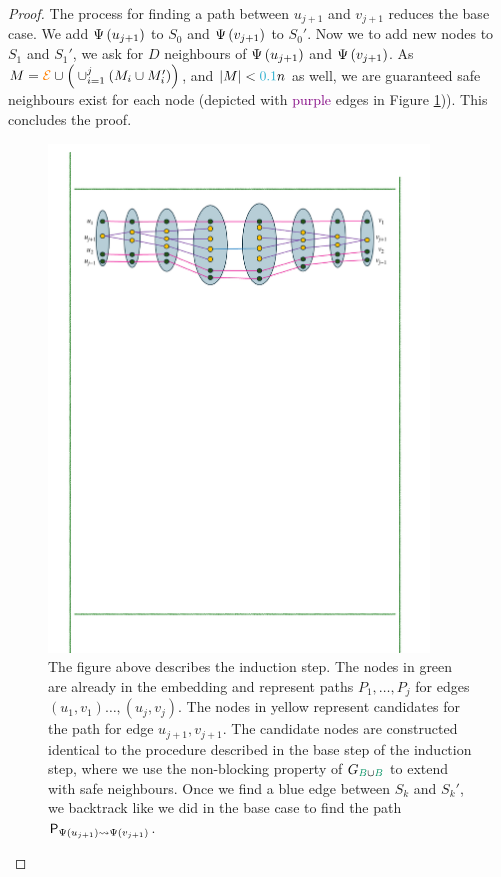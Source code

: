 \documentclass[11pt]{article}
\begin{document}
\begin{proof}
The process for finding a path between $u_{j+1}$ and $v_{j+1}$ reduces the base case.
We add $\Psi\left(u_{j+1}\right)$ to $S_0$ and $\Psi\left(v_{j+1}\right)$ to $S_0'$.
Now we to add new nodes to $S_{1}$ and $S_{1}'$, we ask for $D$ neighbours of $\Psi\left(u_{j+1}\right)$ and $\Psi\left(v_{j+1}\right)$. As $M = \textcolor{orange}{\mathcal{E}} \cup \Big(\cup_{i=1}^{j} (M_i \cup M'_i)\Big)$, and $|M| < \epsilonA n$ as well, we are guaranteed safe neighbours exist for each node (depicted with \textcolor{purple}{purple} edges in Figure \ref{fig:induction})).
This concludes the proof.

\begin{figure}
	\includegraphics[width=0.9\textwidth
	]{assets/InductionStep.pdf}
	\caption{The figure above describes the induction step. The nodes in green are already in the embedding and represent paths $P_1, \dots, P_j$ for edges $(u_1, v_1) \dots, (u_j, v_j)$.
	The nodes in yellow represent candidates for the path for edge $u_{j+1}, v_{j+1}$. 
	The candidate nodes are constructed identical to the procedure described in the base step of the induction step, where we use the non-blocking property of $\BipartiteG$ to extend with safe neighbours.
    Once we find a blue edge between $S_k$ and $S_k'$, we backtrack like we did in the base case to find the path $\mathsf{P}_{\Psi\left(u_{j+1}\right) \rightsquigarrow \Psi\left(v_{j+1}\right) }$.
	}
	\label{fig:induction}
\end{figure}

	
\end{proof}
\end{document}
